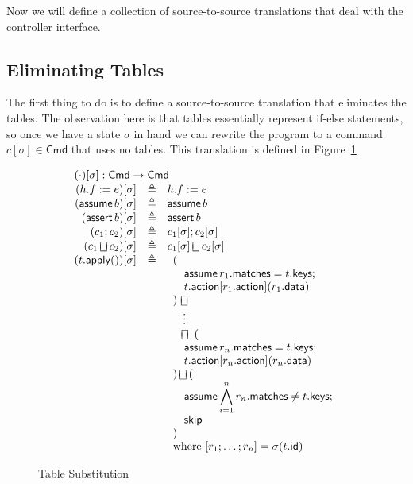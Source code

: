 \documentclass{article}
\newcommand{\Cmd}{\mathsf{Cmd}}
\newcommand{\matches}{\mathsf{matches}}
\newcommand{\action}{\mathsf{action}}
\newcommand{\keys}{\mathsf{keys}}
\newcommand{\data}{\mathsf{data}}
\newcommand{\id}{\mathsf{id}}
\newcommand{\assert}{\mathop{\mathsf{assert}}}
\newcommand{\assume}{\mathop{\mathsf{assume}}}
\newcommand{\apply}{\mathsf{apply}}
\newcommand{\choiceop}{\rotatebox[origin=c]{90}{$\sqsubset\!\!\!\sqsupset$}}
\newcommand{\choice}{\mathbin{\choiceop}}
\newcommand{\SKIP}{\mathsf{skip}}
\begin{document}
Now we will define a collection of source-to-source translations that deal with
the controller interface.

\subsection{Eliminating Tables}

The first thing to do is to define a source-to-source translation that
eliminates the tables. The observation here is that tables essentially represent
if-else statements, so once we have a state $\sigma$ in hand we can rewrite the
program to a command $c[\sigma] \in \Cmd$ that uses no tables. This translation
is defined in Figure~\ref{fig:table-elim}

\begin{figure}
  \[\begin{array}{r>{\triangleq}cl}
  \multicolumn{3}{l}{(\cdot)[\sigma] : \Cmd \to \Cmd} \\
  (h.f := e)[\sigma] && h.f := e   \\
  (\assume b)[\sigma] && \assume b \\
  (\assert b)[\sigma] && \assert b \\
  (c_1;c_2)[\sigma] && c_1[\sigma];c_2[\sigma] \\
  (c_1 \choice c_2)[\sigma] && c_1[\sigma] \choice c_2[\sigma] \\
  (t.\apply())[\sigma] &&
  \begin{array}[t]{l}
    (\\
    \quad \assume {r_1.\matches = t.\keys};\\
    \quad t.\action[r_1.\action](r_1.\data)\\
    )~\choice\\
    \phantom)~\,\vdots\\
    \phantom)\,\choice~(\\
    \quad \assume {r_n.\matches = t.\keys};\\
    \quad t.\action[r_n.\action](r_n.\data)\\
    )\choice (\\
    \quad \displaystyle \assume {\bigwedge_{i=1}^n r_n.\matches \neq t.\keys};\\
    \quad \SKIP \\
    )\\
    \textrm{where}~[r_1;\ldots;r_n] = \sigma(t.\id)
  \end{array}
  \end{array}
  \]
  \caption{Table Substitution}
  \label{fig:table-elim}
\end{figure}
\end{document}
